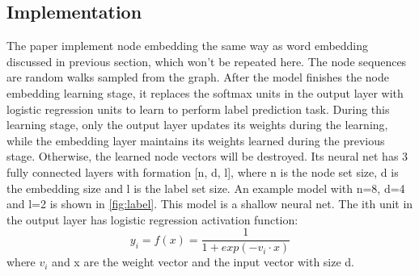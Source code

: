 \documentclass{article}
\begin{document}
\subsection{Implementation}
The paper implement node embedding the same way as word embedding discussed in previous section, which won't be repeated here. The node sequences are random walks sampled from the graph. After the model finishes the node embedding learning stage, it replaces the softmax units in the output layer with logistic regression units to learn to perform label prediction task. During this learning stage, only the output layer updates its weights during the learning, while the embedding layer maintains its weights learned during the previous stage. Otherwise, the learned node vectors will be destroyed. Its neural net has 3 fully connected layers with formation [n, d, l], where n is the node set size, d is the embedding size and l is the label set size. An example model with n=8, d=4 and l=2 is shown in \autoref{fig:label}. This model is a shallow neural net. The ith unit in the output layer has logistic regression activation function:
\begin{equation}
y_i = f(x) = \frac{1}{1 + exp(-v_i \cdot x)}
\end{equation}
where $ v_i $ and x are the weight vector and the input vector with size d.
\end{document}
